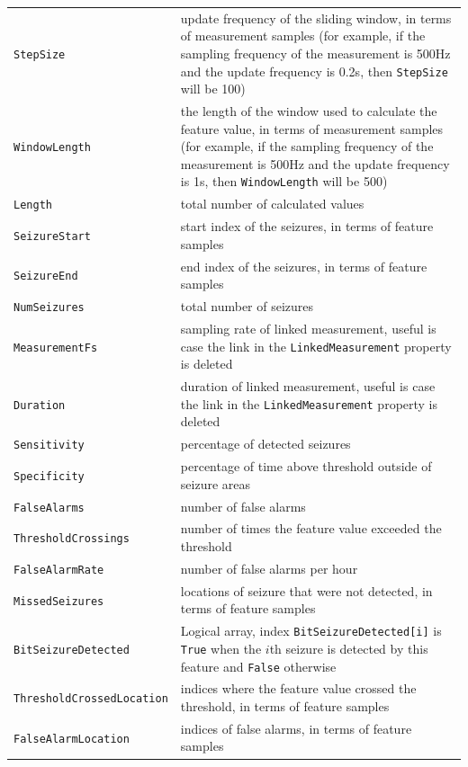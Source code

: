 \documentclass[usletter, 11pt]{extarticle}
\begin{document}
\begin{center}
\begin{longtable}{p{5cm}|p{12cm}}
    \texttt{StepSize} & update frequency of the sliding window, in terms of measurement samples (for example, if the sampling frequency of the measurement is 500Hz and the update frequency is 0.2s, then \verb|StepSize| will be 100)\\
    \texttt{WindowLength} & the length of the window used to calculate the feature value, in terms of measurement samples (for example, if the sampling frequency of the measurement is 500Hz and the update frequency is 1s, then \verb|WindowLength| will be 500)\\
    \texttt{Length} & total number of calculated values \\
    
    \texttt{SeizureStart} & start index of the seizures, in terms of feature samples \\
    \texttt{SeizureEnd} & end index of the seizures, in terms of feature samples \\
    \texttt{NumSeizures} & total number of seizures \\
    \texttt{MeasurementFs} & sampling rate of linked measurement, useful is case the link in the \verb|LinkedMeasurement| property is deleted \\
    \texttt{Duration} & duration of linked measurement, useful is case the link in the \verb|LinkedMeasurement| property is deleted \\
    
    \texttt{Sensitivity} & percentage of detected seizures \\
    \texttt{Specificity} & percentage of time above threshold outside of seizure areas \\
    \texttt{FalseAlarms} & number of false alarms \\
    \texttt{ThresholdCrossings} & number of times the feature value exceeded the threshold \\
    \texttt{FalseAlarmRate} & number of false alarms per hour \\
    \texttt{MissedSeizures} & locations of seizure that were not detected, in terms of feature samples \\
    \texttt{BitSeizureDetected} & Logical array, index \verb|BitSeizureDetected[i]| is \verb|True| when the $i$th seizure is detected by this feature and \verb|False| otherwise \\
    \texttt{ThresholdCrossedLocation} & indices where the feature value crossed the threshold, in terms of feature samples \\
    \texttt{FalseAlarmLocation} & indices of false alarms, in terms of feature samples 
	\end{longtable}
\end{center}
\end{document}
